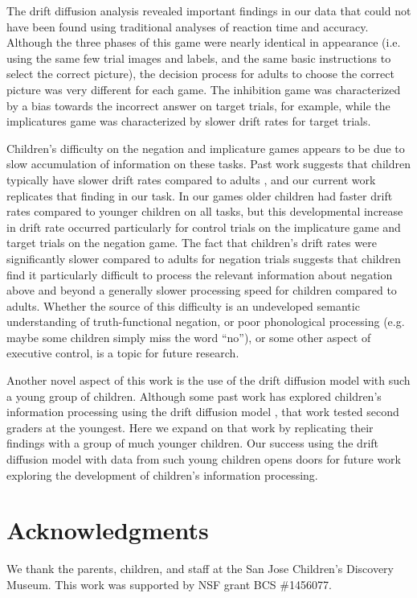 \documentclass[10pt,letterpaper]{article}
\begin{document}
The drift diffusion analysis revealed important findings in our data that could not have been found using traditional analyses of reaction time and accuracy.  Although the three phases of this game were nearly identical in appearance (i.e. using the same few trial images and labels, and the same basic instructions to select the correct picture), the decision process for adults to choose the correct picture was very different for each game.  The inhibition game was characterized by a bias towards the incorrect answer on target trials, for example, while the implicatures game was characterized by slower drift rates for target trials.  

Children's difficulty on the negation and implicature games appears to be due to slow accumulation of information on these tasks.  Past work suggests that children typically have slower drift rates compared to adults \cite{ratcliff2012}, and our current work replicates that finding in our task.  In our games older children had faster drift rates compared to younger children on all tasks, but this developmental increase in drift rate occurred particularly for control trials on the implicature game and target trials on the negation game.  The fact that children's drift rates were significantly slower compared to adults for negation trials suggests that children find it particularly difficult to process the relevant information about negation above and beyond a generally slower processing speed for children compared to adults.  Whether the source of this difficulty is an undeveloped semantic understanding of truth-functional negation, or poor phonological processing (e.g. maybe some children simply miss the word ``no''), or some other aspect of executive control, is a topic for future research.  

Another novel aspect of this work is the use of the drift diffusion model with such a young group of children.  Although some past work has explored children's information processing using the drift diffusion model \cite{ratcliff2012}, that work tested second graders at the youngest.  Here we expand on that work by replicating their findings with a group of much younger children.  Our success using the drift diffusion model with data from such young children opens doors for future work exploring the development of children's information processing.

\section{Acknowledgments}
%
We thank the parents, children, and staff at the San Jose Children's Discovery Museum. This work was supported by NSF grant BCS \#1456077. 




\setlength{\bibleftmargin}{.125in}
\setlength{\bibindent}{-\bibleftmargin}


\end{document}
